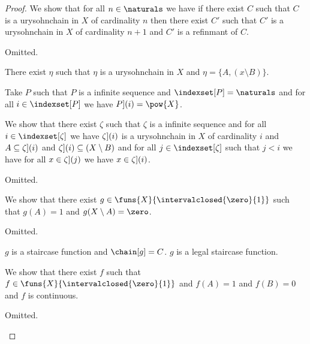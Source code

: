 \begin{proof}
    We show that for all $n \in \naturals$ we have
    if there exist $C$ such that $C$ is a urysohnchain in $X$ of cardinality $n$ 
    then there exist $C'$  such that $C'$ is a urysohnchain in $X$ of cardinality $n+1$ 
    and $C'$ is a refinmant of $C$.
    \begin{subproof}
        Omitted.
    \end{subproof}

    There exist $\eta$ such that $\eta$ is a urysohnchain in $X$ and $\eta =\{A, (x \setminus B)\}$.

    

    Take $P$ such that $P$ is a infinite sequence and $\indexset[P] = \naturals$ and for all $i \in \indexset[P]$ we have $\index[P](i) = \pow{X}$.
    
    We show that there exist $\zeta$ such that $\zeta$ is a infinite sequence 
    and for all $i \in \indexset[\zeta]$ we have 
    $\index[\zeta](i)$ is a urysohnchain in $X$ of cardinality $i$
    and $A \subseteq \index[\zeta](i)$
    and $\index[\zeta](i) \subseteq (X \setminus B)$
    and for all $j \in \indexset[\zeta]$ such that 
    $j < i$ we have for all $x \in \index[\zeta](j)$ we have $x \in \index[\zeta](i)$.
    \begin{subproof}
        Omitted.
    \end{subproof}
  
    


    



    We show that there exist $g \in \funs{X}{\intervalclosed{\zero}{1}}$ such that $g(A)=1$ and $g(X\setminus A) = \zero$.
    \begin{subproof}
        Omitted.
    \end{subproof}
    $g$ is a staircase function and $\chain[g] = C$.
    $g$ is a legal staircase function.


    We show that there exist $f$ such that $f \in \funs{X}{\intervalclosed{\zero}{1}}$ 
    and $f(A) = 1$ and $f(B)= 0$ and $f$ is continuous.
    \begin{subproof}
        Omitted.
    \end{subproof}




\end{proof}
